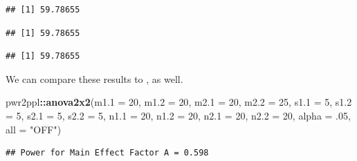 \documentclass[
]{book}
\newenvironment{Shaded}{\begin{snugshade}}{\end{snugshade}}
\newcommand{\DataTypeTok}[1]{\textcolor[rgb]{0.13,0.29,0.53}{#1}}
\newcommand{\DecValTok}[1]{\textcolor[rgb]{0.00,0.00,0.81}{#1}}
\newcommand{\FloatTok}[1]{\textcolor[rgb]{0.00,0.00,0.81}{#1}}
\newcommand{\KeywordTok}[1]{\textcolor[rgb]{0.13,0.29,0.53}{\textbf{#1}}}
\newcommand{\NormalTok}[1]{#1}
\newcommand{\OperatorTok}[1]{\textcolor[rgb]{0.81,0.36,0.00}{\textbf{#1}}}
\newcommand{\StringTok}[1]{\textcolor[rgb]{0.31,0.60,0.02}{#1}}
\begin{document}
\begin{verbatim}
## [1] 59.78655
\end{verbatim}

\begin{Shaded}
\end{Shaded}

\begin{verbatim}
## [1] 59.78655
\end{verbatim}

\begin{Shaded}
\end{Shaded}

\begin{verbatim}
## [1] 59.78655
\end{verbatim}

We can compare these results to \citep{R-pwr2ppl}, as well.

\begin{Shaded}
\begin{Highlighting}[]
\NormalTok{pwr2ppl}\OperatorTok{::}\KeywordTok{anova2x2}\NormalTok{(}\DataTypeTok{m1.1 =} \DecValTok{20}\NormalTok{,}
         \DataTypeTok{m1.2 =} \DecValTok{20}\NormalTok{,}
         \DataTypeTok{m2.1 =} \DecValTok{20}\NormalTok{,}
         \DataTypeTok{m2.2 =} \DecValTok{25}\NormalTok{,}
         \DataTypeTok{s1.1 =} \DecValTok{5}\NormalTok{,}
         \DataTypeTok{s1.2 =} \DecValTok{5}\NormalTok{,}
         \DataTypeTok{s2.1 =} \DecValTok{5}\NormalTok{,}
         \DataTypeTok{s2.2 =} \DecValTok{5}\NormalTok{,}
         \DataTypeTok{n1.1 =} \DecValTok{20}\NormalTok{,}
         \DataTypeTok{n1.2 =} \DecValTok{20}\NormalTok{,}
         \DataTypeTok{n2.1 =} \DecValTok{20}\NormalTok{,}
         \DataTypeTok{n2.2 =} \DecValTok{20}\NormalTok{,}
         \DataTypeTok{alpha =} \FloatTok{.05}\NormalTok{,}
         \DataTypeTok{all =} \StringTok{"OFF"}\NormalTok{)}
\end{Highlighting}
\end{Shaded}

\begin{verbatim}
## Power for Main Effect Factor A = 0.598
\end{verbatim}
\end{document}
